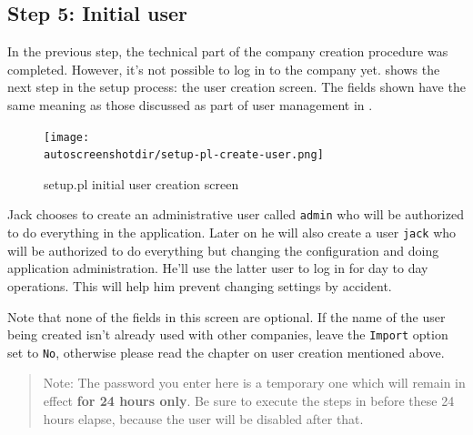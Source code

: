 \subsection{Step 5: Initial user}
\label{subsec-create-setup-initial-user}

In the previous step, the technical part of the company creation procedure
was completed. However, it's not possible to log in to the company yet. 
 shows the next step in the setup process:
 the user creation screen. The fields shown have
the same meaning as those discussed as part of user management in .

\begin{figure}[H]
\centering
\texttt{[image: \\autoscreenshotdir/setup-pl-create-user.png]}
\caption{setup.pl initial user creation screen}
\label{fig:setup-step5}
\end{figure}

Jack chooses to create an administrative user called \texttt{admin} who will be authorized
to do everything in the application. Later on he will also create a user \texttt{jack}
who will be authorized to do everything but changing the configuration and doing application administration.
He'll use the latter user to log in for day to day operations. This will help him prevent changing settings by accident.

Note that none of the fields in this screen are optional. If the name of the user being created
isn't already used with other companies, leave the \texttt{Import} option set to \texttt{No},
otherwise please read the chapter on user creation mentioned above.

\begin{quote}
Note: The password you enter here is a temporary one which will remain in effect
\textbf{for 24 hours only}. Be sure to execute the steps in  before
these 24 hours elapse, because the user will be disabled after that.
\end{quote}

